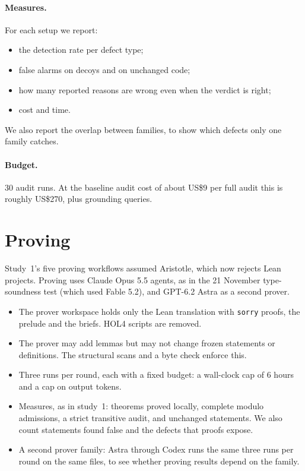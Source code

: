 \documentclass[11pt,a4paper]{article}
\newcommand{\code}[1]{\texttt{#1}}
\begin{document}
\paragraph{Measures.} For each setup we report:
\begin{itemize}
\item the detection rate per defect type;
\item false alarms on decoys and on unchanged code;
\item how many reported reasons are wrong even when the verdict is right;
\item cost and time.
\end{itemize}
We also report the overlap between families, to show which defects only one family catches.

\paragraph{Budget.} 30 audit runs. At the baseline audit cost of about US\$9 per full audit this is roughly US\$270, plus grounding queries.

\section{Proving}\label{sec:proving}
Study~1's five proving workflows assumed Aristotle, which now rejects Lean projects. Proving uses Claude Opus 5.5 agents, as in the 21 November type-soundness test (which used Fable 5.2), and GPT-6.2 Astra as a second prover.
\begin{itemize}
\item The prover workspace holds only the Lean translation with \code{sorry} proofs, the prelude and the briefs. HOL4 scripts are removed.
\item The prover may add lemmas but may not change frozen statements or definitions. The structural scans and a byte check enforce this.
\item Three runs per round, each with a fixed budget: a wall-clock cap of 6 hours and a cap on output tokens.
\item Measures, as in study~1: theorems proved locally, complete modulo admissions, a strict transitive audit, and unchanged statements. We also count statements found false and the defects that proofs expose.
\item A second prover family: Astra through Codex runs the same three runs per round on the same files, to see whether proving results depend on the family.
\end{itemize}
\end{document}
